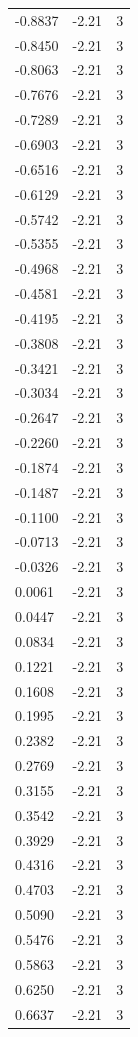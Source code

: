 \begin{longtable}{lrr}
  -0.8837 & -2.21 & 3 \\
  -0.8450 & -2.21 & 3 \\
  -0.8063 & -2.21 & 3 \\
  -0.7676 & -2.21 & 3 \\
  -0.7289 & -2.21 & 3 \\
  -0.6903 & -2.21 & 3 \\
  -0.6516 & -2.21 & 3 \\
  -0.6129 & -2.21 & 3 \\
  -0.5742 & -2.21 & 3 \\
  -0.5355 & -2.21 & 3 \\
  -0.4968 & -2.21 & 3 \\
  -0.4581 & -2.21 & 3 \\
  -0.4195 & -2.21 & 3 \\
  -0.3808 & -2.21 & 3 \\
  -0.3421 & -2.21 & 3 \\
  -0.3034 & -2.21 & 3 \\
  -0.2647 & -2.21 & 3 \\
  -0.2260 & -2.21 & 3 \\
  -0.1874 & -2.21 & 3 \\
  -0.1487 & -2.21 & 3 \\
  -0.1100 & -2.21 & 3 \\
  -0.0713 & -2.21 & 3 \\
  -0.0326 & -2.21 & 3 \\
  0.0061 & -2.21 & 3 \\
  0.0447 & -2.21 & 3 \\
  0.0834 & -2.21 & 3 \\
  0.1221 & -2.21 & 3 \\
  0.1608 & -2.21 & 3 \\
  0.1995 & -2.21 & 3 \\
  0.2382 & -2.21 & 3 \\
  0.2769 & -2.21 & 3 \\
  0.3155 & -2.21 & 3 \\
  0.3542 & -2.21 & 3 \\
  0.3929 & -2.21 & 3 \\
  0.4316 & -2.21 & 3 \\
  0.4703 & -2.21 & 3 \\
  0.5090 & -2.21 & 3 \\
  0.5476 & -2.21 & 3 \\
  0.5863 & -2.21 & 3 \\
  0.6250 & -2.21 & 3 \\
  0.6637 & -2.21 & 3 \\

\end{longtable}
